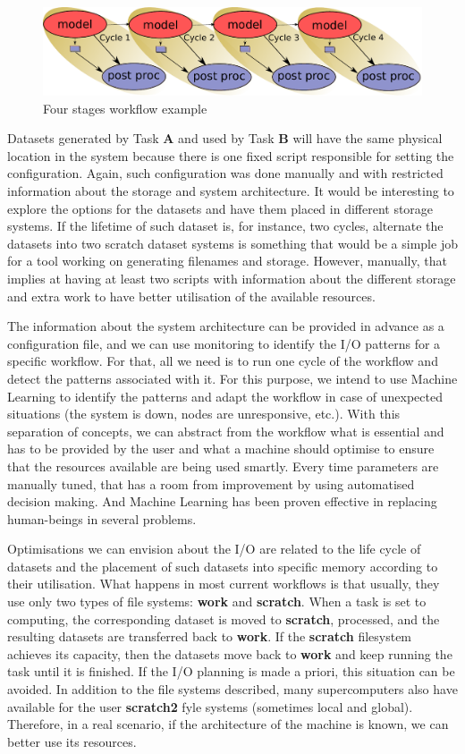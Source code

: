 \documentclass[a4paper]{article}
\begin{document}
{{{{\begin{figure}[H]
  \centering
  \includegraphics[width=0.8\columnwidth]{cycle-4}
  \caption{Four stages workflow example}
  \label{fig:cycle-4}
\end{figure}

Datasets generated by Task \textbf{A} and used by Task \textbf{B} will have the same physical location in the system because there is one fixed script responsible for setting the configuration. Again, such configuration was done manually and with restricted information about the storage and system architecture. It would be interesting to explore the options for the datasets and have them placed in different storage systems. If the lifetime of such dataset is, for instance, two cycles, alternate the datasets into two scratch dataset systems is something that would be a simple job for a tool working on generating filenames and storage. However, manually, that implies at having at least two scripts with information about the different storage and extra work to have better utilisation of the available resources.

The information about the system architecture can be provided in advance as a configuration file, and we can use monitoring to identify the I/O patterns for a specific workflow. For that, all we need is to run one cycle of the workflow and detect the patterns associated with it. For this purpose, we intend to use Machine Learning to identify the patterns and adapt the workflow in case of unexpected situations (the system is down, nodes are unresponsive, etc.).
With this separation of concepts, we can abstract from the workflow what is essential and has to be provided by the user and what a machine should optimise to ensure that the resources available are being used smartly. Every time parameters are manually tuned, that has a room from improvement by using automatised decision making. And Machine Learning has been proven effective in replacing human-beings in several problems.

Optimisations we can envision about the I/O are related to the life cycle of datasets and the placement of such datasets into specific memory according to their utilisation. What happens in most current workflows is that usually, they use only two types of file systems: \textbf{work} and \textbf{scratch}. When a task is set to computing, the corresponding dataset is moved to \textbf{scratch}, processed, and the resulting datasets are transferred back to \textbf{work}. If the \textbf{scratch} filesystem achieves its capacity, then the datasets move back to \textbf{work} and keep running the task until it is finished. If the I/O planning is made a priori, this situation can be avoided.
In addition to the file systems described, many supercomputers also have available for the user \textbf{scratch2} fyle systems (sometimes local and global). Therefore, in a real scenario, if the architecture of the machine is known, we can better use its resources.

}}}}
\end{document}
